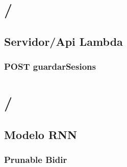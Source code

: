 \section{\accelcapture/}
\subsection{Servidor/Api Lambda}\label{app:code:accelcapturelambda}
\subsubsection{POST guardarSesions}


\section{\ifell/}
\subsection{Modelo RNN}
\subsubsection{Prunable Bidir}\label{app:code:ifell:prunebidir}

